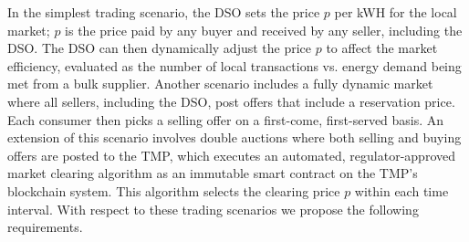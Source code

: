 \documentclass[sigplan]{acmart}
\newcommand{\Karla}[1]{\todo[color=green!50, linecolor=black!50]{\textbf{Karla}: #1}}
\newcommand{\Aron}[1]{\todo[color=blue!30, linecolor=black!50]{\textbf{Aron}: #1}}
\begin{document}
In the simplest trading scenario, the DSO sets the price $p$ per kWH for the local market; $p$ is the price paid by any buyer and received by any seller, including the DSO.  The DSO can then dynamically adjust the price $p$ to affect the market efficiency, evaluated as the number of local transactions  vs. energy demand being met from a bulk supplier. Another scenario includes a fully dynamic market where all sellers, including the DSO, post offers that include a reservation price. Each consumer then picks a selling offer on a first-come, first-served basis. An extension of this scenario involves double auctions where both selling and buying offers are posted to the TMP, which executes an automated, regulator-approved market clearing algorithm as an immutable smart contract on the TMP's blockchain system. This algorithm selects the clearing price $p$ within each time interval. With respect to these trading scenarios we propose the following requirements.






\end{document}
